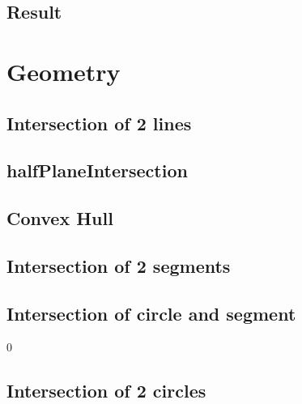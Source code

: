 \documentclass[a4paper,10pt,twocolumn,oneside]{article}
\begin{document}
\subsection{Result}


\section{Geometry}

% 


\subsection{Intersection of 2 lines}


% 
\subsection{halfPlaneIntersection}


\subsection{Convex Hull}



\subsection{Intersection of 2 segments}


\subsection{Intersection of circle and segment}0


%

\subsection{Intersection of 2 circles}
\end{document}

